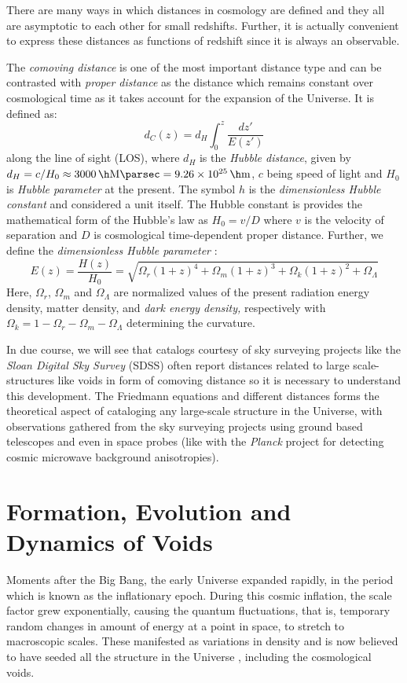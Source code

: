 \documentclass[fleqn,usenatbib]{mnras}
\begin{document}
There are many ways in which distances in cosmology are defined and they all are asymptotic to each other for small redshifts. Further, it is actually convenient to express these distances as functions of redshift since it is always an observable.

The \textit{comoving distance} is one of the most important distance type and can be contrasted with \textit{proper distance} as the distance which remains constant over cosmological time as it takes account for the expansion of the Universe. It is defined as:
\begin{equation}\label{key}
	d_C (z) = d_H \int_0^z \dfrac{dz'}{E(z')}
\end{equation}
along the line of sight (LOS), where $ d_H $ is the \textit{Hubble distance}, given by $ d_H = c/H_0 \approx \SI{3000}{\per \h \mega \parsec} = \SI{9.26e25}{\per \h \meter} $, $ c $ being speed of light and $ H_0 $ is \textit{Hubble parameter} at the present. The symbol $ h $ is the \textit{dimensionless Hubble constant} and considered a unit itself. The Hubble constant is provides the mathematical form of the Hubble's law as $ H_0 = v/D $ where $ v $ is the velocity of separation and $ D $ is cosmological time-dependent proper distance. Further, we define the \textit{dimensionless Hubble parameter} \citep{peebles_principles_1993}:
\begin{equation}\label{key}
	E (z) = \dfrac{H(z)}{H_0} = \sqrt{\Omega_r (1+z)^4 + \Omega_m (1+z)^3 + \Omega_k(1+z)^2 + \Omega_{\Lambda}}
\end{equation}
Here, $ \Omega_{r} $, $ \Omega_{m} $ and $ \Omega_{\Lambda} $ are normalized values of the present radiation energy density, matter density, and \textit{dark energy density,} respectively with $ \Omega_k = 1 - \Omega_{r} - \Omega_{m} - \Omega_{\Lambda}$ determining the curvature. 

In due course, we will see that catalogs courtesy of sky surveying projects like the \textit{Sloan Digital Sky Survey} (SDSS) often report distances related to large scale-structures like voids in form of comoving distance so it is necessary to understand this development. The Friedmann equations and different distances forms the theoretical aspect of cataloging any large-scale structure in the Universe, with observations gathered from the sky surveying projects using ground based telescopes and even in space probes (like with the \textit{Planck} project for detecting cosmic microwave background anisotropies).


\section{Formation, Evolution and Dynamics of Voids}
Moments after the Big Bang, the early Universe expanded rapidly, in the period which is known as the inflationary epoch. During this cosmic inflation, the scale factor grew exponentially, causing the quantum fluctuations, that is, temporary random changes in amount of energy at a point in space, to stretch to macroscopic scales. These manifested as variations in density and is now believed to have seeded all the structure in the Universe \citep{hartle_gravity_2003}, including the cosmological voids.
\end{document}
